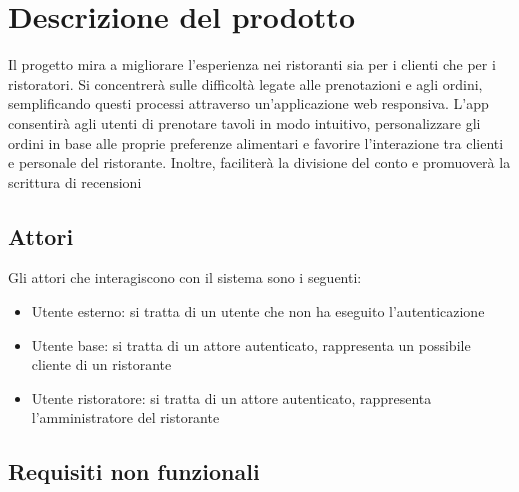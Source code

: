 \section{Descrizione del prodotto}
Il progetto mira a migliorare l'esperienza nei ristoranti sia per i clienti che
per i ristoratori. Si concentrerà sulle difficoltà legate alle prenotazioni e
agli ordini, semplificando questi processi attraverso un'applicazione web
responsiva. L'app consentirà agli utenti di prenotare tavoli in modo intuitivo,
personalizzare gli ordini in base alle proprie preferenze alimentari e favorire
l'interazione tra clienti e personale del ristorante. Inoltre, faciliterà la
divisione del conto e promuoverà la scrittura di recensioni

\subsection{Attori}
Gli attori che interagiscono con il sistema sono i seguenti:
\begin{itemize}
	\item Utente esterno: si tratta di un utente che non ha eseguito l'autenticazione
	\item Utente base: si tratta di un attore autenticato, rappresenta un possibile cliente di un ristorante
	\item Utente ristoratore: si tratta di un attore autenticato, rappresenta l'amministratore del ristorante
\end{itemize}

\subsection{Requisiti non funzionali}
